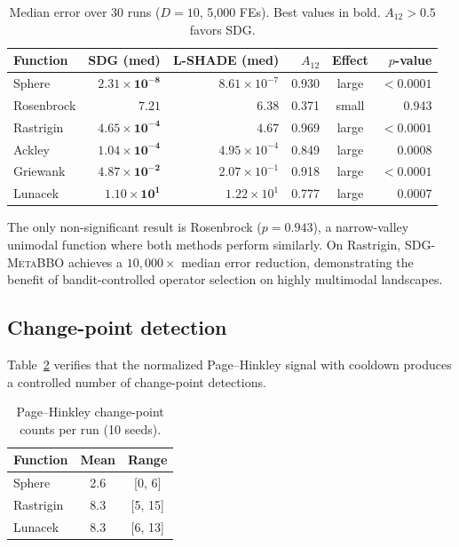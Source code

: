 \documentclass[preprint,12pt,authoryear]{elsarticle}
\newcommand{\sdg}{\textsc{SDG-MetaBBO}}
\begin{document}
\begin{table}[t]
\centering
\caption{Median error over 30 runs ($D = 10$, 5{,}000 FEs). Best values in bold. $A_{12} > 0.5$ favors SDG.}
\label{tab:main}
\begin{tabular}{lrrrcr}
\toprule
Function & SDG (med) & L-SHADE (med) & $A_{12}$ & Effect & $p$-value \\
\midrule
Sphere & $\mathbf{2.31 \times 10^{-8}}$ & $8.61 \times 10^{-7}$ & 0.930 & large & $< 0.0001$ \\
Rosenbrock & $7.21$ & $\mathbf{6.38}$ & 0.371 & small & 0.943 \\
Rastrigin & $\mathbf{4.65 \times 10^{-4}}$ & $4.67$ & 0.969 & large & $< 0.0001$ \\
Ackley & $\mathbf{1.04 \times 10^{-4}}$ & $4.95 \times 10^{-4}$ & 0.849 & large & 0.0008 \\
Griewank & $\mathbf{4.87 \times 10^{-2}}$ & $2.07 \times 10^{-1}$ & 0.918 & large & $< 0.0001$ \\
Lunacek & $\mathbf{1.10 \times 10^{1}}$ & $1.22 \times 10^{1}$ & 0.777 & large & 0.0007 \\
\bottomrule
\end{tabular}
\end{table}

The only non-significant result is Rosenbrock ($p = 0.943$), a narrow-valley unimodal function where both methods perform similarly. On Rastrigin, \sdg{} achieves a $10{,}000\times$ median error reduction, demonstrating the benefit of bandit-controlled operator selection on highly multimodal landscapes.

\subsection{Change-point detection}

Table~\ref{tab:changepoints} verifies that the normalized Page--Hinkley signal with cooldown produces a controlled number of change-point detections.

\begin{table}[h]
\centering
\caption{Page--Hinkley change-point counts per run (10 seeds).}
\label{tab:changepoints}
\begin{tabular}{lcc}
\toprule
Function & Mean & Range \\
\midrule
Sphere & 2.6 & [0, 6] \\
Rastrigin & 8.3 & [5, 15] \\
Lunacek & 8.3 & [6, 13] \\
\bottomrule
\end{tabular}
\end{table}
\end{document}

